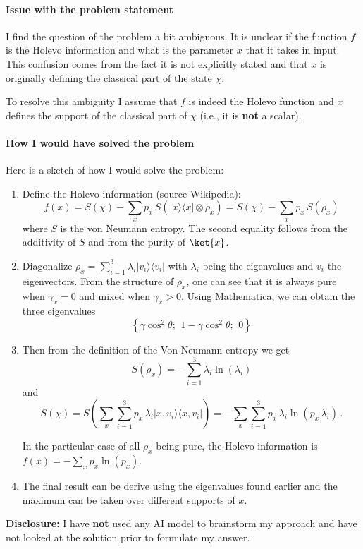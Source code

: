 {
\color{blue}
\paragraph*{Issue with the problem statement}

I find the question of the problem a bit ambiguous. It is unclear if the function $f$ is the Holevo information and what is the parameter $x$ that it takes in input. This confusion comes from the fact it is not explicitly stated and that $x$ is originally defining the classical part of the state $\chi$. 

To resolve this ambiguity I assume that $f$ is indeed the Holevo function and $x$ defines the support of the classical part of $\chi$ (i.e., it is \textbf{not} a scalar).


\paragraph*{How I would have solved the problem}
Here is a sketch of how I would solve the problem:
\begin{enumerate}
  \item Define the Holevo information (source Wikipedia): 
  $$
    f(x)=S\!\left(\chi\right) - \sum_x p_x \,S\!\left(|x\rangle\langle x|\otimes\rho_x\right)=S\!\left(\chi\right) - \sum_x p_x\, S\!\left(\rho_x\right)
  $$
  where $S$ is the von Neumann entropy. The second equality follows from the additivity of $S$ and from the purity of $\ket{x}$.

  \item Diagonalize $\rho_x=\sum_{i=1}^3\lambda_i|v_i\rangle\langle v_i|$ with $\lambda_i$ being the eigenvalues and $v_i$ the eigenvectors. From the structure of $\rho_x$, one can see that it is always pure when $\gamma_x=0$ and mixed when $\gamma_x>0$. Using Mathematica, we can obtain the three eigenvalues
  $$
    \left\{
  \gamma \cos^2\theta;\ \,
  1-\gamma \cos^2\theta;\ \, 0
  \right\}
  $$
  
  \item Then from the definition of the Von Neumann entropy we get
  $$
    S\left(\rho_x\right) = -\sum_{i=1}^3 \lambda_i \ln(\lambda_i)
  $$
  and 
  $$
    S\left(\chi\right) = S\left(\sum_x\sum_{i=1}^3 p_x\,\lambda_i|x,v_i\rangle\langle x,v_i|\right) = -\sum_x\sum_{i=1}^3 p_x\,\lambda_i \ln(p_x\,\lambda_i)\,.
  $$

  In the particular case of all $\rho_x$ being pure, the Holevo information is $f(x) = -\sum_x p_x \ln(p_x)$.

  \item The final result can be derive using the eigenvalues found earlier and the maximum can be taken over different supports of $x$.
  
\end{enumerate}

\textbf{Disclosure:} I have \textbf{not} used any AI model to brainstorm my approach and have not looked at the solution prior to formulate my answer. 

}